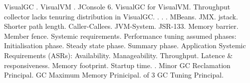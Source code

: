 \I VisualGC .
\I VisualVM .
\I JConsole  \tw{<} 6.
\I VisualGC for VisualVM.
\I Throughput collector lacks tenuring distribution in VisualGC.
\I {}.
\I {}.
\I {}.
\I MBeans.
\I JMX.
\I jstack.
\I Shorter path length.
\I Caller-Callees.
\I JVM-System.
\I JSR-133.
\I Memory barrier.
\I Member fence.
\I Systemic requirements.
\I Performance tuning assumed phases:
\II Initialisation phase.
\II Steady state phase.
\II Summary phase.
\I Application Systemic Requirements (ASRs):
\II Availability.
\II Manageability.
\II Throughput.
\II Latence \& responsiveness.
\II Memory footprint.
\II Startup time.
\I {}.
\I Minor GC Reclamation Principal.
\I GC Maximum Memory Prinicipal.
 of 3 GC Tuning Principal.
\bye
